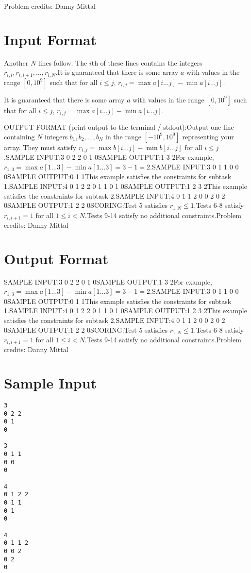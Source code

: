 \documentclass[12pt]{article}
\begin{document}
Problem credits: Danny Mittal



\section*{Input Format}
Another $N$ lines follow. The $i$th of these lines contains the integers
$r_{i, i}, r_{i, i + 1}, \ldots, r_{i, N}$.It is guaranteed that there is some array $a$ with values in the range
$[0, 10^9]$ such that for all $i \leq j$,
$r_{i, j} = \max a[i\ldots j] - \min a[i\ldots j]$.

It is guaranteed that there is some array $a$ with values in the range
$[0, 10^9]$ such that for all $i \leq j$,
$r_{i, j} = \max a[i\ldots j] - \min a[i\ldots j]$.

OUTPUT FORMAT (print output to the terminal / stdout):Output one line containing $N$ integers $b_1, b_2, \ldots, b_N$ in the range
$[-10^9, 10^9]$ representing your array. They must satisfy
$r_{i, j} = \max b[i\ldots j] - \min b[i\ldots j]$ for all $i \leq j$.SAMPLE INPUT:3
0 2 2
0 1
0SAMPLE OUTPUT:1 3 2For example, $r_{1, 3} = \max a[1\ldots 3] - \min a[1\ldots 3] = 3 - 1 = 2$.SAMPLE INPUT:3
0 1 1
0 0
0SAMPLE OUTPUT:0 1 1This example satisfies the constraints for subtask 1.SAMPLE INPUT:4
0 1 2 2
0 1 1
0 1
0SAMPLE OUTPUT:1 2 3 2This example satisfies the constraints for subtask 2.SAMPLE INPUT:4
0 1 1 2
0 0 2
0 2
0SAMPLE OUTPUT:1 2 2 0SCORING:Test 5 satisfies $r_{1,N} \leq 1$.Tests 6-8 satisfy $r_{i,i+1} = 1$ for all $1 \leq i < N$.Tests 9-14 satisfy no additional constraints.Problem credits: Danny Mittal

\section*{Output Format}
SAMPLE INPUT:3
0 2 2
0 1
0SAMPLE OUTPUT:1 3 2For example, $r_{1, 3} = \max a[1\ldots 3] - \min a[1\ldots 3] = 3 - 1 = 2$.SAMPLE INPUT:3
0 1 1
0 0
0SAMPLE OUTPUT:0 1 1This example satisfies the constraints for subtask 1.SAMPLE INPUT:4
0 1 2 2
0 1 1
0 1
0SAMPLE OUTPUT:1 2 3 2This example satisfies the constraints for subtask 2.SAMPLE INPUT:4
0 1 1 2
0 0 2
0 2
0SAMPLE OUTPUT:1 2 2 0SCORING:Test 5 satisfies $r_{1,N} \leq 1$.Tests 6-8 satisfy $r_{i,i+1} = 1$ for all $1 \leq i < N$.Tests 9-14 satisfy no additional constraints.Problem credits: Danny Mittal

\section*{Sample Input}
\begin{verbatim}
3
0 2 2
0 1
0

3
0 1 1
0 0
0

4
0 1 2 2
0 1 1
0 1
0

4
0 1 1 2
0 0 2
0 2
0
\end{verbatim}
\end{document}
